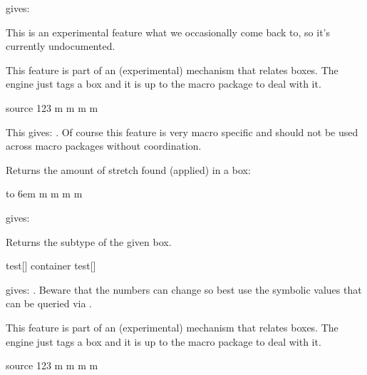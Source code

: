 \typebuffer

gives: \inlinebuffer

\stopnewprimitive

\startnewprimitive[title={\prm {boxsnapping}}]

This is an experimental feature what we occasionally come back to, so it's
currently undocumented.

\stopnewprimitive

\startnewprimitive[title={\prm {boxsource}}]

This feature is part of an (experimental) mechanism that relates boxes. The
engine just tags a box and it is up to the macro package to deal with it.

\startbuffer
{}\hbox source 123 {m m m m}
\the{}
\stopbuffer

\typebuffer

This gives: \inlinebuffer. Of course this feature is very macro specific and
should not be used across macro packages without coordination.

\stopnewprimitive

\startnewprimitive[title={\prm {boxstretch}}]

Returns the amount of stretch found (applied) in a box:

\startbuffer
{}\hbox to 6em {m m m m}
\the{}
\stopbuffer

\typebuffer

gives: \inlinebuffer

\stopnewprimitive

\startnewprimitive[title={\prm {boxsubtype}}]

Returns the subtype of the given box.

\startbuffer
{}\hbox           {test}[\the{}]
\hbox container {test}[\the{}]
\stopbuffer

\typebuffer

gives: \inlinebuffer. Beware that the numbers can change so best use the symbolic
values that can be queried via \LUA.

\stopnewprimitive

\startnewprimitive[title={\prm {boxtarget}}]

This feature is part of an (experimental) mechanism that relates boxes. The
engine just tags a box and it is up to the macro package to deal with it.

\startbuffer
{}\hbox source 123 {m m m m}
\the{}
\stopbuffer

